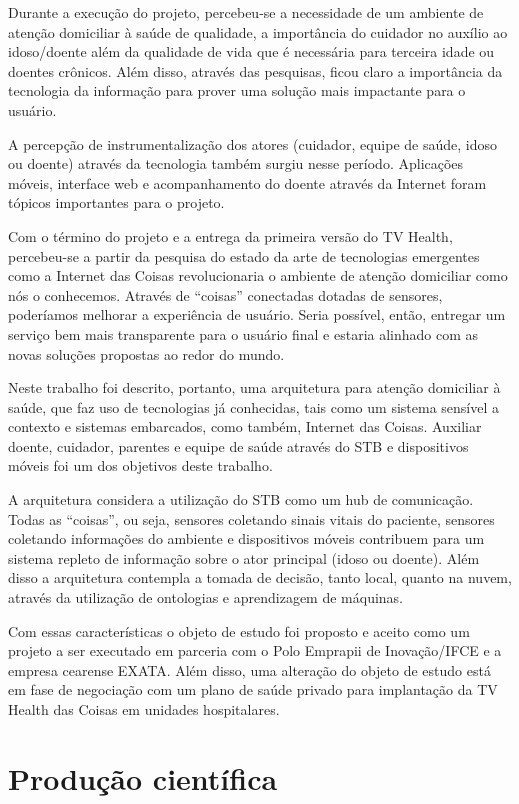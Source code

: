 Durante a execução do projeto, percebeu-se a necessidade de um ambiente de
atenção domiciliar à saúde de qualidade, a importância do cuidador no auxílio
ao idoso/doente além da qualidade de vida que é necessária para terceira idade
ou doentes crônicos. Além disso, através das pesquisas, ficou claro a
importância da tecnologia da informação para prover uma solução mais impactante
para o usuário. 

A percepção de instrumentalização dos atores (cuidador, equipe de saúde, idoso
ou doente) através da tecnologia também surgiu nesse período. Aplicações
móveis, interface web e acompanhamento do doente através da Internet foram
tópicos importantes para o projeto.

Com o término do projeto \nextsaude[] e a entrega da primeira versão do TV Health,
percebeu-se a partir da pesquisa do estado da arte de tecnologias emergentes
como a Internet das Coisas revolucionaria o ambiente de atenção domiciliar como
nós o conhecemos. Através de ``coisas'' conectadas dotadas de sensores,
poderíamos melhorar a experiência de usuário. Seria possível, então, entregar
um serviço bem mais transparente para o usuário final e estaria alinhado com as
novas soluções propostas ao redor do mundo.

Neste trabalho foi descrito, portanto, uma arquitetura para atenção domiciliar
à saúde, que faz uso de tecnologias já conhecidas, tais como um sistema
sensível a contexto e sistemas embarcados, como também, Internet das Coisas.
Auxiliar doente, cuidador, parentes e equipe de saúde através do STB e
dispositivos móveis foi um dos objetivos deste trabalho. 

A arquitetura considera a utilização do STB como um hub de comunicação. Todas
as ``coisas'', ou seja, sensores coletando sinais vitais do paciente, sensores
coletando informações do ambiente e dispositivos móveis contribuem para um
sistema repleto de informação sobre o ator principal (idoso ou doente). Além
disso a arquitetura contempla a tomada de decisão, tanto local, quanto na
nuvem, através da utilização de ontologias e aprendizagem de máquinas.

Com essas características o objeto de estudo foi proposto e aceito como um
projeto a ser executado em parceria com o Polo Emprapii de Inovação/IFCE e
a empresa cearense EXATA. Além disso, uma alteração do objeto de estudo
está em fase de negociação com um plano de saúde privado para implantação
da TV Health das Coisas em unidades hospitalares.

\section{Produção científica}\label{sec:producao}  

